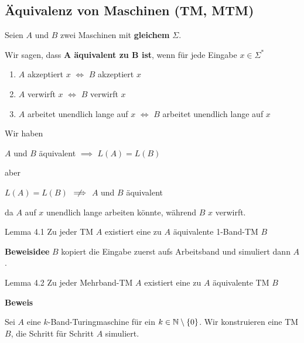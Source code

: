    
    
        \subsection{Äquivalenz von Maschinen (TM, MTM)}
        \begin{mainbox}{}
            Seien $A$ und $B$ zwei Maschinen mit \textbf{gleichem} $\Sigma$.
    
            Wir sagen, dass \textbf{$\mathbf{A}$ äquivalent zu $\mathbf{B}$ ist}, wenn für jede Eingabe $x \in \Sigma^*$
            \begin{enumerate}[label=(\roman*)]
                \item $A$ akzeptiert $x$ $\iff$ $B$ akzeptiert $x$
                \item $A$ verwirft $x$ $\iff$ $B$ verwirft $x$
                \item $A$ arbeitet unendlich lange auf $x$ $\iff$ $B$ arbeitet unendlich lange auf $x$
            \end{enumerate}
        \end{mainbox}
        Wir haben 
        \begin{center}
            $A$ und $B$ äquivalent $\implies$ $L(A) = L(B)$
    
            aber 
    
            $L(A) = L(B)$ $\centernot{\implies}$ $A$ und $B$ äquivalent
        \end{center}
        da $A$ auf $x$ unendlich lange arbeiten könnte, während $B$ $x$ verwirft.
    
        \begin{mainbox}{Lemma 4.1}
            Zu jeder TM $A$ existiert eine zu $A$ äquivalente 1-Band-TM $B$
        \end{mainbox}
        \textbf{Beweisidee}
        $B$ kopiert die Eingabe zuerst aufs Arbeitsband und simuliert dann $A$.
    
        \begin{mainbox}{Lemma 4.2}
            Zu jeder Mehrband-TM $A$ existiert eine zu $A$ äquivalente TM $B$
        \end{mainbox}
        \textbf{Beweis}
        
        Sei $A$ eine $k$-Band-Turingmaschine für ein $k \in \mathbb{N} \setminus \{0\}$. Wir konstruieren eine TM $B$, die Schritt für Schritt $A$ simuliert.

